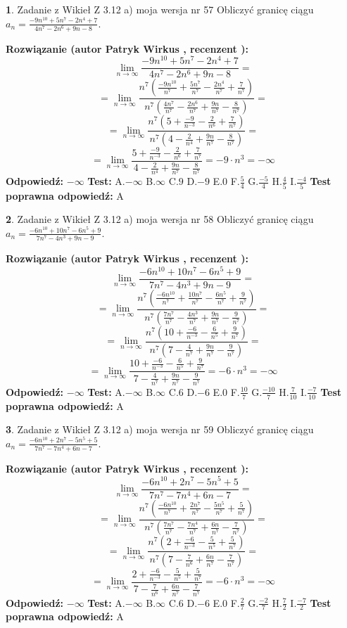 \documentclass[12pt, a4paper]{article}
\theoremstyle{definition} %
\newtheorem{zad}{}
\newcommand{\zadStart}[1]{\begin{zad}#1\newline}
\newcommand{\zadStop}{\end{zad}}
\newcommand{\rozwStart}[2]{\noindent \textbf{Rozwiązanie (autor #1 , recenzent #2): }\newline}
\newcommand{\rozwStop}{\newline}
\newcommand{\odpStart}{\noindent \textbf{Odpowiedź:}\newline}
\newcommand{\odpStop}{\newline}
\newcommand{\testStart}{\noindent \textbf{Test:}\newline}
\newcommand{\testStop}{\newline}
\newcommand{\kluczStart}{\noindent \textbf{Test poprawna odpowiedź:}\newline}
\newcommand{\kluczStop}{\newline}
\begin{document}
\zadStart{Zadanie z Wikieł Z 3.12 a) moja wersja nr 57}
Obliczyć granicę ciągu $a_{n}=\frac{-9n^{10}+5n^{7}-2n^{4}+7}{4n^{7}-2n^{6}+9n-8}$.
\zadStop
\rozwStart{Patryk Wirkus}{}
$$\lim\limits_{n\to\infty}\frac{-9n^{10}+5n^{7}-2n^{4}+7}{4n^{7}-2n^{6}+9n-8}=$$
$$=\lim\limits_{n\to\infty}\frac{n^{7}\left(\frac{-9n^{10}}{n^{7}}+\frac{5n^{7}}{n^{7}}-\frac{2n^{4}}{n^{7}}+\frac{7}{n^{7}}\right)}{n^{7}\left(\frac{4n^{7}}{n^{7}}-\frac{2n^{6}}{n^{7}}+\frac{9n}{n^{7}}-\frac{8}{n^{7}}\right)}=$$
$$=\lim\limits_{n\to\infty}\frac{n^{7}\left(5+\frac{-9}{n^{-3}}-\frac{2}{n^{6}}+\frac{7}{n^{7}}\right)}
{n^{7}\left(4-\frac{2}{n^{4}}+\frac{9n}{n^{7}}-\frac{8}{n^{7}}\right)}=$$
$$=\lim\limits_{n\to\infty}\frac{5+\frac{-9}{n^{-3}}-\frac{2}{n^{6}}+\frac{7}{n^{7}}}{4-\frac{2}{n^{4}}+\frac{9n}{n^{7}}-\frac{8}{n^{7}}}=-9\cdot n^{3} = -\infty$$
\rozwStop
\odpStart
$-\infty$
\odpStop
\testStart
A.$-\infty$
B.$\infty$
C.$9$
D.$-9$
E.$0$
F.$\frac{5}{4}$
G.$\frac{-5}{4}$
H.$\frac{4}{5}$
I.$\frac{-4}{5}$
\testStop
\kluczStart
A
\kluczStop



\zadStart{Zadanie z Wikieł Z 3.12 a) moja wersja nr 58}
Obliczyć granicę ciągu $a_{n}=\frac{-6n^{10}+10n^{7}-6n^{5}+9}{7n^{7}-4n^{3}+9n-9}$.
\zadStop
\rozwStart{Patryk Wirkus}{}
$$\lim\limits_{n\to\infty}\frac{-6n^{10}+10n^{7}-6n^{5}+9}{7n^{7}-4n^{3}+9n-9}=$$
$$=\lim\limits_{n\to\infty}\frac{n^{7}\left(\frac{-6n^{10}}{n^{7}}+\frac{10n^{7}}{n^{7}}-\frac{6n^{5}}{n^{7}}+\frac{9}{n^{7}}\right)}{n^{7}\left(\frac{7n^{7}}{n^{7}}-\frac{4n^{3}}{n^{7}}+\frac{9n}{n^{7}}-\frac{9}{n^{7}}\right)}=$$
$$=\lim\limits_{n\to\infty}\frac{n^{7}\left(10+\frac{-6}{n^{-3}}-\frac{6}{n^{5}}+\frac{9}{n^{7}}\right)}
{n^{7}\left(7-\frac{4}{n^{7}}+\frac{9n}{n^{7}}-\frac{9}{n^{7}}\right)}=$$
$$=\lim\limits_{n\to\infty}\frac{10+\frac{-6}{n^{-3}}-\frac{6}{n^{5}}+\frac{9}{n^{7}}}{7-\frac{4}{n^{7}}+\frac{9n}{n^{7}}-\frac{9}{n^{7}}}=-6\cdot n^{3} = -\infty$$
\rozwStop
\odpStart
$-\infty$
\odpStop
\testStart
A.$-\infty$
B.$\infty$
C.$6$
D.$-6$
E.$0$
F.$\frac{10}{7}$
G.$\frac{-10}{7}$
H.$\frac{7}{10}$
I.$\frac{-7}{10}$
\testStop
\kluczStart
A
\kluczStop



\zadStart{Zadanie z Wikieł Z 3.12 a) moja wersja nr 59}
Obliczyć granicę ciągu $a_{n}=\frac{-6n^{10}+2n^{7}-5n^{5}+5}{7n^{7}-7n^{4}+6n-7}$.
\zadStop
\rozwStart{Patryk Wirkus}{}
$$\lim\limits_{n\to\infty}\frac{-6n^{10}+2n^{7}-5n^{5}+5}{7n^{7}-7n^{4}+6n-7}=$$
$$=\lim\limits_{n\to\infty}\frac{n^{7}\left(\frac{-6n^{10}}{n^{7}}+\frac{2n^{7}}{n^{7}}-\frac{5n^{5}}{n^{7}}+\frac{5}{n^{7}}\right)}{n^{7}\left(\frac{7n^{7}}{n^{7}}-\frac{7n^{4}}{n^{7}}+\frac{6n}{n^{7}}-\frac{7}{n^{7}}\right)}=$$
$$=\lim\limits_{n\to\infty}\frac{n^{7}\left(2+\frac{-6}{n^{-3}}-\frac{5}{n^{5}}+\frac{5}{n^{7}}\right)}
{n^{7}\left(7-\frac{7}{n^{6}}+\frac{6n}{n^{7}}-\frac{7}{n^{7}}\right)}=$$
$$=\lim\limits_{n\to\infty}\frac{2+\frac{-6}{n^{-3}}-\frac{5}{n^{5}}+\frac{5}{n^{7}}}{7-\frac{7}{n^{6}}+\frac{6n}{n^{7}}-\frac{7}{n^{7}}}=-6\cdot n^{3} = -\infty$$
\rozwStop
\odpStart
$-\infty$
\odpStop
\testStart
A.$-\infty$
B.$\infty$
C.$6$
D.$-6$
E.$0$
F.$\frac{2}{7}$
G.$\frac{-2}{7}$
H.$\frac{7}{2}$
I.$\frac{-7}{2}$
\testStop
\kluczStart
A
\kluczStop
\end{document}
